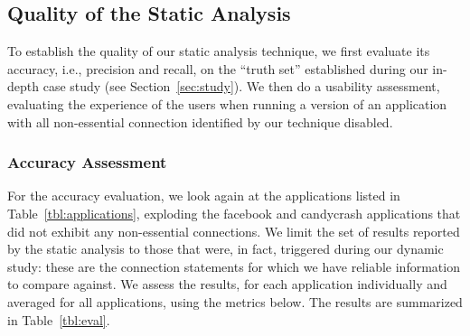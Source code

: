 
\subsection{Quality of the Static Analysis}
To establish the quality of our static analysis technique, we 
first evaluate its accuracy, i.e., precision and recall, on the ``truth set'' established during our in-depth case study (see Section~\ref{sec:study}).
We then do a usability assessment, evaluating the experience of the users when running a version of an application with all non-essential connection identified by our technique disabled. 

\subsubsection{Accuracy Assessment}
For the accuracy evaluation, we look again at the applications listed in 
Table~\ref{tbl:applications}, exploding the facebook and candycrash applications that did not exhibit any non-essential connections. We limit the set of results reported by the static analysis to those that were, in fact, triggered during our dynamic study: these are the connection statements for which we have reliable information to compare against. 
We assess the results, for each application individually and averaged for all applications, using the metrics below. The results are summarized in Table~\ref{tbl:eval}.

